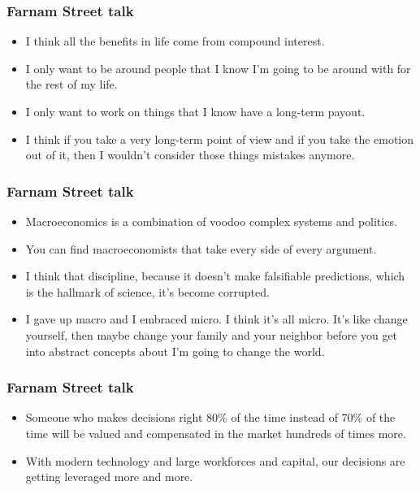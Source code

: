 \begin{frame}[fragile]\frametitle{Farnam Street talk}

\begin{itemize}
\item I think all the benefits in life come from compound interest. 
\item I only want to be around people that I know I’m going to be around with for the rest of my life. 
\item I only want to work on things that I know have a long-term payout.
\item I think if you take a very long-term point of view and if you take the emotion out of it, then I wouldn’t consider those things mistakes anymore.
\end{itemize}

\end{frame}

\begin{frame}[fragile]\frametitle{Farnam Street talk}

\begin{itemize}
\item Macroeconomics is a combination of voodoo complex systems and politics. 
\item You can find macroeconomists that take every side of every argument. 
\item I think that discipline, because it doesn’t make falsifiable predictions, which is the hallmark of science, it’s become corrupted.
\item I gave up macro and I embraced micro. I think it’s all micro. It’s like change yourself, then maybe change your family and your neighbor before you get into abstract concepts about I’m going to change the world.
\end{itemize}

\end{frame}

\begin{frame}[fragile]\frametitle{Farnam Street talk}

\begin{itemize}
\item Someone who makes decisions right 80\% of the time instead of 70\% of the time will be valued and compensated in the market hundreds of times more. 
\item With modern technology and large workforces and capital, our decisions are getting leveraged more and more.
\end{itemize}

\end{frame}

